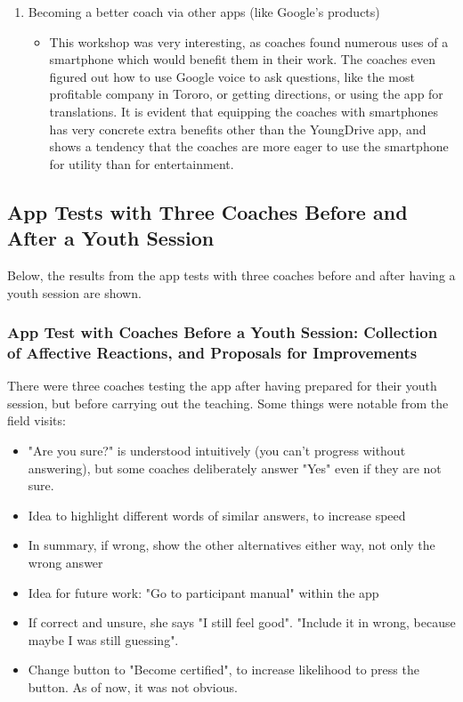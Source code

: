 \begin{enumerate}
\begin{itemize}
  \end{itemize}
  \item Becoming a better coach via other apps (like Google's products)
  \begin{itemize}
    \item This workshop was very interesting, as coaches found numerous uses of a smartphone which would benefit them in their work. The coaches even figured out how to use Google voice to ask questions, like the most profitable company in Tororo, or getting directions, or using the app for translations. It is evident that equipping the coaches with smartphones has very concrete extra benefits other than the YoungDrive app, and shows a tendency that the coaches are more eager to use the smartphone for utility than for entertainment.
  \end{itemize}
  \end{enumerate}

\subsection{App Tests with Three Coaches Before and After a Youth Session}

Below, the results from the app tests with three coaches before and after having a youth session are shown.

  \subsubsection{App Test with Coaches Before a Youth Session: Collection of Affective Reactions, and Proposals for Improvements}

  There were three coaches testing the app after having prepared for their youth session, but before carrying out the teaching. Some things were notable from the field visits: %
  \begin{itemize}
    \item "Are you sure?" is understood intuitively (you can't progress without answering), but some coaches deliberately answer "Yes" even if they are not sure.
    \item Idea to highlight different words of similar answers, to increase speed
    \item In summary, if wrong, show the other alternatives either way, not only the wrong answer
    \item Idea for future work: "Go to participant manual" within the app %
    \item If correct and unsure, she says "I still feel good". "Include it in wrong, because maybe I was still guessing".
    \item Change button to "Become certified", to increase likelihood to press the button. As of now, it was not obvious.
  \end{itemize}

